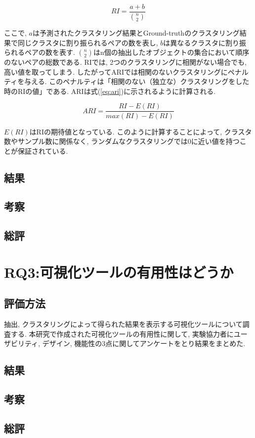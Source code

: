 \begin{equation}
  \label{eq:ri}
  RI = \frac{a+b}{\binom{n}{2}}
\end{equation}

ここで, \(a\)は予測されたクラスタリング結果とGround-truthのクラスタリング結果で同じクラスタに割り振られるペアの数を表し, \(b\)は異なるクラスタに割り振られるペアの数を表す. \(\binom{n}{2}\)はn個の抽出したオブジェクトの集合において順序のないペアの総数である. 
RIでは, 2つのクラスタリングに相関がない場合でも, 高い値を取ってしまう. したがってARIでは相関のないクラスタリングにペナルティを与える. このペナルティは「相関のない（独立な）クラスタリングをした時のRIの値」である. ARIは式(\ref{eq:ari})に示されるように計算される. 

\begin{equation}
  \label{eq:ari}
  ARI = \frac{RI-E(RI)}{max(RI)-E(RI)}
\end{equation}

\(E(RI)\)はRIの期待値となっている. このように計算することによって, クラスタ数やサンプル数に関係なく, ランダムなクラスタリングでは0に近い値を持つことが保証されている. 

\subsection{結果}

\subsection{考察}

\subsection{総評}



\section{RQ3:可視化ツールの有用性はどうか}
\subsection{評価方法}
抽出, クラスタリングによって得られた結果を表示する可視化ツールについて調査する. 本研究で作成された可視化ツールの有用性に関して, 実験協力者にユーザビリティ, デザイン, 機能性の3点に関してアンケートをとり結果をまとめた. 

\subsection{結果}

\subsection{考察}

\subsection{総評}